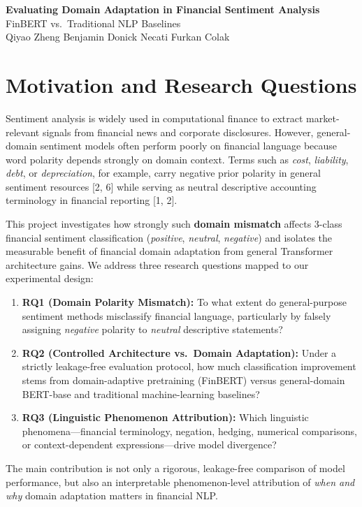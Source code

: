 \documentclass[11pt,a4paper]{article}
\begin{document}
\begin{center}
    {\Large\textbf{Evaluating Domain Adaptation in Financial Sentiment Analysis}}\\[2pt]
    {\normalsize FinBERT vs.\ Traditional NLP Baselines}\\[3pt]
    {\normalsize Qiyao Zheng \quad Benjamin Donick \quad Necati Furkan Colak}
\end{center}
\vspace{-4pt}

\section*{Motivation and Research Questions}
Sentiment analysis is widely used in computational finance to extract market-relevant signals from financial news and corporate disclosures. However, general-domain sentiment models often perform poorly on financial language because word polarity depends strongly on domain context. Terms such as \textit{cost}, \textit{liability}, \textit{debt}, or \textit{depreciation}, for example, carry negative prior polarity in general sentiment resources [2, 6] while serving as neutral descriptive accounting terminology in financial reporting [1, 2].

This project investigates how strongly such \textbf{domain mismatch} affects 3-class financial sentiment classification (\textit{positive}, \textit{neutral}, \textit{negative}) and isolates the measurable benefit of financial domain adaptation from general Transformer architecture gains. We address three research questions mapped to our experimental design:
\begin{enumerate}[topsep=1pt,itemsep=1pt,parsep=0pt,leftmargin=1.5em]
    \item \textbf{RQ1 (Domain Polarity Mismatch):} To what extent do general-purpose sentiment methods misclassify financial language, particularly by falsely assigning \textit{negative} polarity to \textit{neutral} descriptive statements?
    \item \textbf{RQ2 (Controlled Architecture vs.\ Domain Adaptation):} Under a strictly leakage-free evaluation protocol, how much classification improvement stems from domain-adaptive pretraining (FinBERT) versus general-domain BERT-base and traditional machine-learning baselines?
    \item \textbf{RQ3 (Linguistic Phenomenon Attribution):} Which linguistic phenomena---financial terminology, negation, hedging, numerical comparisons, or context-dependent expressions---drive model divergence?
\end{enumerate}
The main contribution is not only a rigorous, leakage-free comparison of model performance, but also an interpretable phenomenon-level attribution of \textit{when and why} domain adaptation matters in financial NLP.
\end{document}
